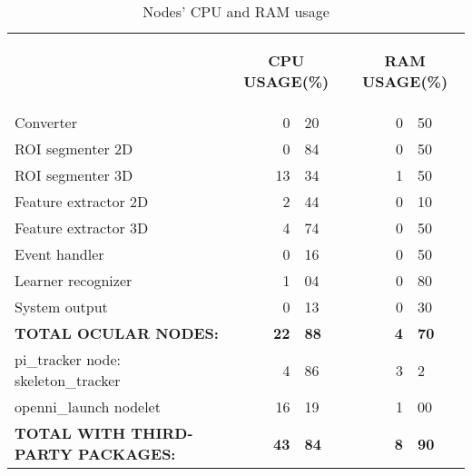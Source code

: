 \newpage 

\begin{table}[H]
\centering
\begin{tabular} {l c r@{.}l c r@{.}l }%
\toprule
\addlinespace[3mm]
   \multicolumn{1}{c}{\begin{center}\textbf{NODES}\end{center}} &
   \multicolumn{3}{c}{\begin{center}\textbf{CPU USAGE(\%)}\end{center}} &
   \multicolumn{3}{c}{\begin{center}\textbf{RAM USAGE(\%)}\end{center}} &\\
\addlinespace[-3mm]
\midrule
Converter && %
0&20 && 0&50 \\
ROI segmenter 2D && %
0&84 && 0&50\\
ROI segmenter 3D && %
 13&34 && 1&50\\
Feature extractor 2D && %
2&44 && 0&10\\
Feature extractor 3D && %
 4&74 && 0&50\\
Event handler && %
0&16 && 0&50 \\
Learner recognizer &&%
1&04 && 0&80 \\
System output && %
0&13 && 0&30 \\
\midrule
\textbf{TOTAL OCULAR NODES: } && %
\textbf{22}&\textbf{88} && \textbf{4}&\textbf{70} \\
\midrule
pi\_tracker node: skeleton\_tracker && 4&86 && 3&2\\
openni\_launch nodelet && 16&19 && 1&00\\
\midrule
\textbf{TOTAL WITH THIRD-PARTY PACKAGES:} && %
\textbf{43}&\textbf{84} && \textbf{8}&\textbf{90} \\
\bottomrule
\end{tabular}
\caption[Nodes' CPU and RAM usage]{Nodes' CPU and RAM usage}
\label{node}

\end{table}




